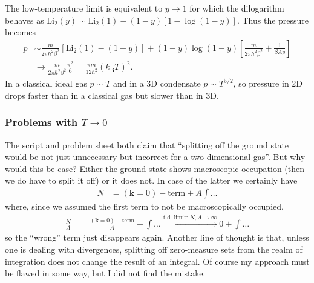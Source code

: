 \documentclass[english, parskip=full]{scrartcl}
\newcommand{\klam}{}
\newcommand{\tecxt}{}
\begin{document}
The low-temperature limit is equivalent to $y\rightarrow 1$ for which the dilogarithm behaves as $\tecxt\text{Li}_2(y) \sim \text{Li}_2(1) - (1-y) \klam\left[ 1 - \log(1 - y) \right]$.
Thus the pressure becomes
\begin{align}
p &\sim \frac{m}{2\pi\hbar^2\beta^2} \klam\left[ \text{Li}_2(1) - (1-y) \right] + (1-y)\log(1-y) \klam\left[ \frac{m}{2\pi\hbar^2\beta^2} + \frac{1}{\beta A y} \right]\\
&\rightarrow \frac{m}{2\pi\hbar^2\beta^2} \frac{\pi^2}{6} = \frac{\pi m}{12 \hbar^2}(k_\tecxt\text{B}T)^2.
\end{align}
In a classical ideal gas $p\sim T$ and in a 3D condensate $p\sim T^{5/2}$, so pressure in 2D drops faster than in a classical gas but slower than in 3D.

\subsubsection*{Problems with $T\rightarrow 0$}
The script and problem sheet both claim that ``splitting off the ground state would be not just unnecessary but incorrect for a two-dimensional gas''. 
But why would this be case?
Either the ground state shows macroscopic occupation (then we do have to split it off) or it does not.
In case of the latter we certainly have
\begin{align}
N &= (\textbf{k} = 0)-\tecxt\text{term} + A \int \dots
\end{align}
where, since we assumed the first term to not be macroscopically occupied,
\begin{align}
\frac{N}{A} &= \frac{(\textbf{k} = 0)-\tecxt\text{term}}{A} + \int \dots \overset{\tecxt\text{t.d. limit: } N,A \rightarrow \infty}{\longrightarrow} 0 + \int \dots
\end{align}
so the ``wrong'' term just disappears again.
Another line of thought is that, unless one is dealing with divergences, splitting off zero-measure sets from the realm of integration does not change the result of an integral.
Of course my approach must be flawed in some way, but I did not find the mistake.
\end{document}
